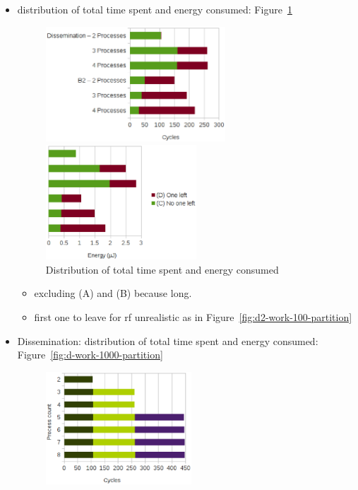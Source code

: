 \documentclass[a4paper, 10pt]{article}
\begin{document}
\begin{itemize}
	\item distribution of total time spent and energy consumed: Figure~\ref{fig:d2-work-1000-partition}
		\begin{figure}[htbp]
			\centering
			\begin{minipage}{0.54\linewidth}
				\includegraphics[height=4.3cm]{charts/d2-time-work-1000-partition}
			\end{minipage}
			\begin{minipage}{0.45\linewidth}
				\includegraphics[height=4.3cm]{charts/d2-energy-work-1000-partition}
			\end{minipage}
			\caption{Distribution of total time spent and energy consumed}
			\label{fig:d2-work-1000-partition}
		\end{figure}
		\begin{itemize}
			\item excluding (A) and (B) because long.
			\item first one to leave for rf unrealistic as in Figure~\ref{fig:d2-work-100-partition}
		\end{itemize}
	\item Dissemination: distribution of total time spent and energy consumed: Figure~\ref{fig:d-work-1000-partition}
		\begin{figure}[htbp]
			\centering
			\begin{minipage}{0.43\linewidth}
				\includegraphics[height=4.2cm]{charts/d-time-work-1000-partition}

\end{minipage}
\end{figure}
\end{itemize}
\end{document}
